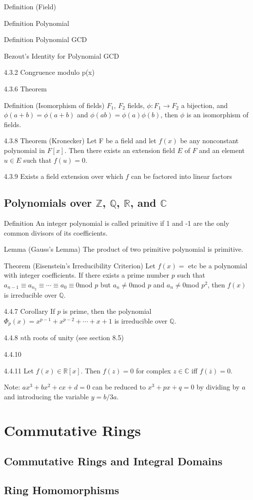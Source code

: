 \documentclass[12pt]{article}
\renewcommand{\mod}{$mod $}
\newcommand{\Z}{\mathbb{Z}}
\newcommand{\Q}{\mathbb{Q}}
\newcommand{\R}{\mathbb{R}}
\newcommand{\C}{\mathbb{C}}
\begin{document}
Definition (Field)

Definition Polynomial

Definition Polynomial GCD

Bezout's Identity for Polynomial GCD

4.3.2 Congruence modulo p(x)

4.3.6 Theorem

Definition (Isomorphism of fields) $F_1$, $F_2$ fields, $\phi : F_1 \to F_2$ a bijection, and $\phi(a + b) = \phi(a + b)$ and $\phi(ab) = \phi(a)\phi(b)$, then $\phi$ is an isomorphism of fields.

4.3.8 Theorem (Kronecker) Let F be a field and let $f(x)$ be any nonconstant polynomial in $F[x]$. Then there exists an extension field $E$ of $F$ and an element $u \in E$ such that $f(u) = 0$.

4.3.9 Exists a field extension over which $f$ can be factored into linear factors

\subsection{Polynomials over $\Z$, $\Q$, $\R$, and $\C$}

Definition An integer polynomial is called primitive if 1 and -1 are the only common divisors of its coefficients.

Lemma (Gauss's Lemma) The product of two primitive polynomial is primitive.

Theorem (Eisenstein's Irreducibility Criterion) Let $f(x) = $ etc be a polynomial with integer coefficients. If there exists a prime number $p$ such that $a_{n-1} \equiv a_{n_2} \equiv \cdots \equiv a_0 \equiv 0 \mod{p}$ but $a_n \neq 0 \mod{p}$ and $a_n \neq 0 \mod{p^2}$, then $f(x)$ is irreducible over $\Q$.

4.4.7 Corollary If $p$ is prime, then the polynomial $\Phi_p(x) = x^{p-1} + x^{p-2} + \cdots + x + 1$ is irreducible over $\Q$.

4.4.8 $n$th roots of unity (see section 8.5)

4.4.10

4.4.11 Let $f(x) \in \R[x]$. Then $f(z) = 0$ for complex $z \in \C$ iff $f(\overline{z}) = 0$.

Note: $ax^3 + bx^2 + cx + d = 0$ can be reduced to $x^3 + px + q = 0$ by dividing by $a$ and introducing the variable $y = b/3a$.

\section{Commutative Rings}

\subsection{Commutative Rings and Integral Domains}

\subsection{Ring Homomorphisms}
\end{document}

